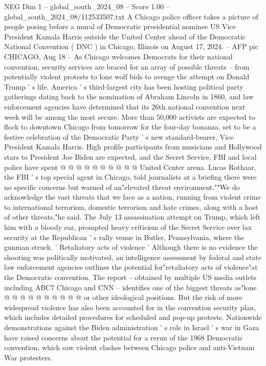 \begin{textsample}{NEG Dim 1 – global\_south\_2024\_08 – Score 1.00 – global\_south\_2024\_08/112533507.txt}  \label{ex:f1_neg_126}
A Chicago police officer takes a picture of people posing before a mural of Democratic presidential nominee US Vice President Kamala Harris outside the United Center ahead of the Democratic National Convention ( DNC ) in Chicago, Illinois on August 17, 2024. -- AFP pic CHICAGO, Aug 18 -- As Chicago welcomes Democrats for their national convention, security services are braced for an array of possible threats -- from potentially violent protests to lone wolf bids to avenge the attempt on Donald Trump ' s life.
America ' s third-largest city has been hosting political party gatherings dating back to the nomination of Abraham Lincoln in 1860, and law enforcement agencies have determined that its 26th national convention next week will be among the most secure.
More than 50,000 activists are expected to flock to downtown Chicago from tomorrow for the four-day bonanza, set to be a festive celebration of the Democratic Party ' s new standard-bearer, Vice President Kamala Harris.
High profile participants from musicians and Hollywood stars to President Joe Biden are expected, and the Secret Service, FBI and local police have spent @ @ @ @ @ @ @ @ @ @ United Center arena.
Lucas Rothaar, the FBI ' s top special agent in Chicago, told journalists at a briefing there were no specific concerns but warned of an"elevated threat environment.""We do acknowledge the vast threats that we face as a nation, running from violent crime to international terrorism, domestic terrorism and hate crimes, along with a host of other threats,"he said.
The July 13 assassination attempt on Trump, which left him with a bloody ear, prompted heavy criticism of the Secret Service over lax security at the Republican ' s rally venue in Butler, Pennsylvania, where the gunman struck. ' Retaliatory acts of violence ' Although there is no evidence the shooting was politically motivated, an intelligence assessment by federal and state law enforcement agencies outlines the potential for"retaliatory acts of violence"at the Democratic convention.
The report -- obtained by multiple US media outlets including ABC7 Chicago and CNN -- identifies one of the biggest threats as"lone @ @ @ @ @ @ @ @ @ @ or other ideological positions.
But the risk of more widespread violence has also been accounted for in the convention security plan, which includes detailed procedures for scheduled and pop-up protests.
Nationwide demonstrations against the Biden administration ' s role in Israel ' s war in Gaza have raised concerns about the potential for a rerun of the 1968 Democratic convention, which saw violent clashes between Chicago police and anti-Vietnam War protesters.

\end{textsample}
